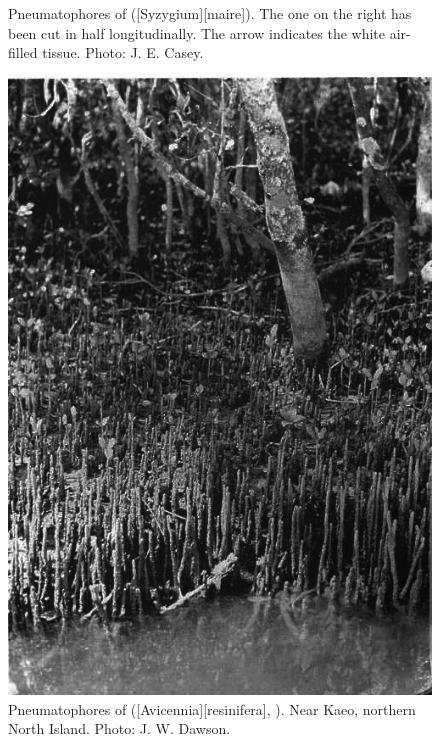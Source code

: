 \begin{figure}[t]
\begin{minipage}[t]{\textwidth}
\begin{minipage}[t]{(\textwidth-\fgap-\fgap) * \real{0.243}}
			\caption[Pneumatophores of swamp maire]{Pneumatophores of  ([Syzygium][maire]).
			The one on the right has been cut in half longitudinally.
			The arrow indicates the white air-filled tissue.
			Photo:  J. E. Casey.}%
			\label{fig:12swampmaire}
		\end{minipage}\hspace{\fgap}%
		\begin{minipage}[t]{(\textwidth-\fgap-\fgap) * \real{0.385}}
			\centering
			\includegraphics[width=\textwidth]{graphics/fig_013}
			\caption[Pneumatophores of mangrove]{Pneumatophores of  ([Avicennia][resinifera], ).
			Near Kaeo, northern North Island.
			Photo:  J. W. Dawson.}%
			\label{fig:13mangrove}
		\end{minipage}\hspace{\fgap}%

\end{minipage}
\end{figure}

